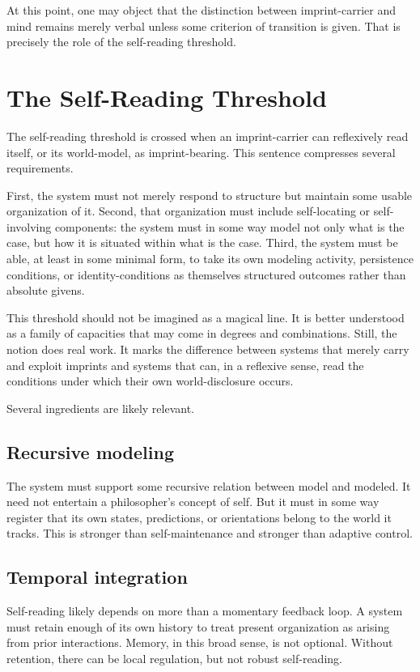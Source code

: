 \documentclass[12pt,a4paper]{article}
\begin{document}
At this point, one may object that the distinction between imprint-carrier and mind remains merely verbal unless some criterion of transition is given. That is precisely the role of the self-reading threshold.

\section{The Self-Reading Threshold}

The self-reading threshold is crossed when an imprint-carrier can reflexively read itself, or its world-model, as imprint-bearing. This sentence compresses several requirements.

First, the system must not merely respond to structure but maintain some usable organization of it. Second, that organization must include self-locating or self-involving components: the system must in some way model not only what is the case, but how it is situated within what is the case. Third, the system must be able, at least in some minimal form, to take its own modeling activity, persistence conditions, or identity-conditions as themselves structured outcomes rather than absolute givens.

This threshold should not be imagined as a magical line. It is better understood as a family of capacities that may come in degrees and combinations. Still, the notion does real work. It marks the difference between systems that merely carry and exploit imprints and systems that can, in a reflexive sense, read the conditions under which their own world-disclosure occurs.

Several ingredients are likely relevant.

\subsection{Recursive modeling}

The system must support some recursive relation between model and modeled. It need not entertain a philosopher's concept of self. But it must in some way register that its own states, predictions, or orientations belong to the world it tracks. This is stronger than self-maintenance and stronger than adaptive control.

\subsection{Temporal integration}

Self-reading likely depends on more than a momentary feedback loop. A system must retain enough of its own history to treat present organization as arising from prior interactions. Memory, in this broad sense, is not optional. Without retention, there can be local regulation, but not robust self-reading.
\end{document}
